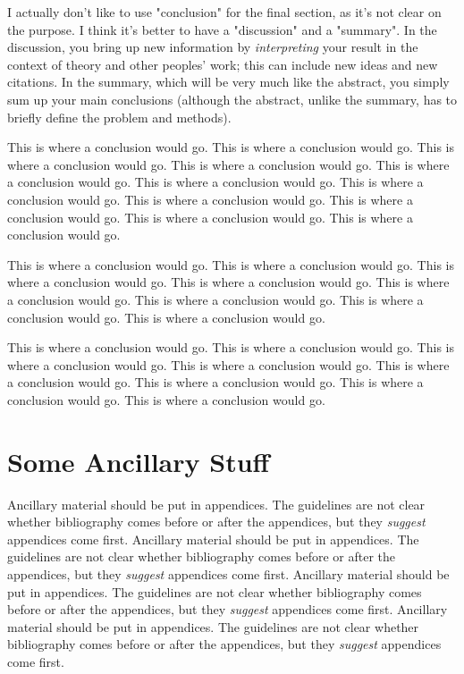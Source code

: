 \documentclass[11pt]{ucscthesisbs}
\begin{document}
I actually don't like to use "conclusion" for the final section, as it's not clear on the purpose.  I think it's better to have a "discussion" and a "summary".  In the discussion, you bring up new information by {\it interpreting} your result in the context of theory and other peoples' work; this can include new ideas and new citations.  In the summary, which will be very much like the abstract, you simply sum up your main conclusions (although the abstract, unlike the summary, has to briefly define the problem and methods).

This is where a conclusion would go.
This is where a conclusion would go.
This is where a conclusion would go.
This is where a conclusion would go.
This is where a conclusion would go.
This is where a conclusion would go.
This is where a conclusion would go.
This is where a conclusion would go.
This is where a conclusion would go.
This is where a conclusion would go.
This is where a conclusion would go.

This is where a conclusion would go.
This is where a conclusion would go.
This is where a conclusion would go.
This is where a conclusion would go.
This is where a conclusion would go.
This is where a conclusion would go.
This is where a conclusion would go.
This is where a conclusion would go.

This is where a conclusion would go.
This is where a conclusion would go.
This is where a conclusion would go.
This is where a conclusion would go.
This is where a conclusion would go.
This is where a conclusion would go.
This is where a conclusion would go.
This is where a conclusion would go.

\appendix
\chapter{Some Ancillary Stuff}

Ancillary material should be put in appendices.  The guidelines are not
clear whether bibliography comes before or after the appendices, but they
\emph{suggest} appendices come first.
Ancillary material should be put in appendices.  The guidelines are not
clear whether bibliography comes before or after the appendices, but they
\emph{suggest} appendices come first.
Ancillary material should be put in appendices.  The guidelines are not
clear whether bibliography comes before or after the appendices, but they
\emph{suggest} appendices come first.
Ancillary material should be put in appendices.  The guidelines are not
clear whether bibliography comes before or after the appendices, but they
\emph{suggest} appendices come first.




\end{document}
